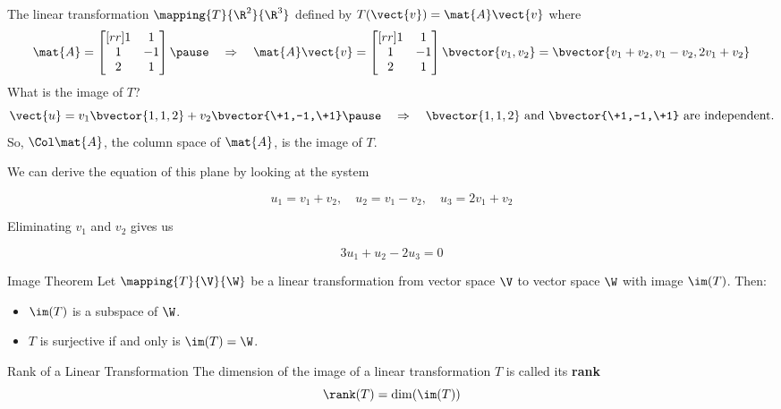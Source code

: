 \documentclass{beamer}
\begin{document}
\begin{frame}
\begin{example}
The linear transformation $\mapping{T}{\R^2}{\R^3}$ defined by $T(\vect{v})=\mat{A}\vect{v}$ where
\begin{equation*}
\mat{A}=
\begin{bmatrix}[rr]
1 & 1 \\
1 & -1 \\
2 & 1 \\
\end{bmatrix}\pause
\quad\Rightarrow\quad
\mat{A}\vect{v}=
\begin{bmatrix}[rr]
1 & 1 \\
1 & -1 \\
2 & 1 \\
\end{bmatrix}
\bvector{v_1,v_2}=
\bvector{v_1+v_2, v_1-v_2, 2v_1+v_2}
\end{equation*}\pause
What is the image of $T$?\pause
\begin{equation*}
\vect{u}=v_1\bvector{1,1,2}+v_2\bvector{\+1,-1,\+1}\pause
\quad\Rightarrow\quad
\bvector{1,1,2}\text{ and }\bvector{\+1,-1,\+1}\text{ are independent.}
\end{equation*}
So, $\Col\mat{A}$, the column space of $\mat{A}$, is the image of $T$.\pause

\vspace{2mm}
We can derive the equation of this plane by looking at the system

\vspace{-4mm}
\begin{equation*}
u_1=v_1+v_2,\quad
u_2=v_1-v_2,\quad
u_3=2v_1+v_2
\end{equation*}\pause

\vspace{-6mm}
Eliminating $v_1$ and $v_2$ gives us

\vspace{-4mm}
\begin{equation*}
3u_1+u_2-2u_3=0
\end{equation*}
\end{example}
\end{frame}

\begin{frame}
\begin{block}{Image Theorem}
Let $\mapping{T}{\V}{\W}$ be a linear transformation from vector space $\V$ to vector space $\W$ with image $\im(T)$. Then:
\onslide<+->
\begin{itemize}[<+- | alert@+>]
\item $\im(T)$ is a subspace of $\W$.
\item $T$ is surjective if and only is $\im(T)=\W$.
\end{itemize}
\end{block}
\onslide<+->
\begin{block}{Rank of a Linear Transformation}
The dimension of the image of a linear transformation $T$ is called its \textbf{rank}
\begin{equation*}
\rank(T)=\dim(\im(T))
\end{equation*}
\end{block}
\end{frame}
\end{document}
